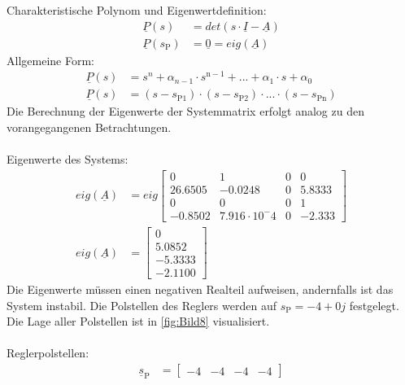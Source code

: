 Charakteristische Polynom und Eigenwertdefinition:
\begin{align*}
    \underline{P}(s) &= det(s\cdot\underline{I}-\underline{A}) \\
    \underline{P}(s_{\mathrm{P}}) &= \underline{0} = eig(\underline{A})
\end{align*}
\newline
Allgemeine Form:
\begin{align*}
        \underline{P}(s) &= s^n+\alpha_{n-1}\cdot s^{\mathrm{n-1}}+...+\alpha_{\mathrm{1}}\cdot s + \alpha_{\mathrm{0}} \\
        \underline{P}(s) &= (s-s_{\mathrm{P1}})\cdot(s-s_{\mathrm{P2}})\cdot ... \cdot (s-s_{\mathrm{Pn}})
\end{align*}
\newline
Die Berechnung der Eigenwerte der Systemmatrix erfolgt analog zu den vorangegangenen Betrachtungen.\\\\
Eigenwerte des Systems:
\begin{align}\label{eq:Gleichung36}
    eig(\underline{A}) &= eig
    \begin{bmatrix}
        0 & 1 & 0 & 0 \\
        26.6505 & -0.0248 & 0 & 5.8333 \\
        0 & 0 & 0 & 1 \\
        -0.8502 & 7.916\cdot10^-4 & 0 & -2.333
    \end{bmatrix} \nonumber\\
    eig(\underline{A}) &=
    \begin{bmatrix}
        0 \\
        5.0852 \\
        -5.3333 \\
        -2.1100
    \end{bmatrix}
\end{align}
\newline
Die Eigenwerte müssen einen negativen Realteil aufweisen, andernfalls ist das System instabil. Die Polstellen des Reglers werden auf $s_{\mathrm{P}} = -4+0j$ festgelegt. Die Lage aller Polstellen ist in \autoref{fig:Bild8} visualisiert.\\\\
Reglerpolstellen:
\begin{align}\label{eq:Gleichung37}
    \underline{s}_{\mathrm{P}} &= 
    \begin{bmatrix}
        -4 & -4 & -4 & -4 
    \end{bmatrix}
\end{align}

